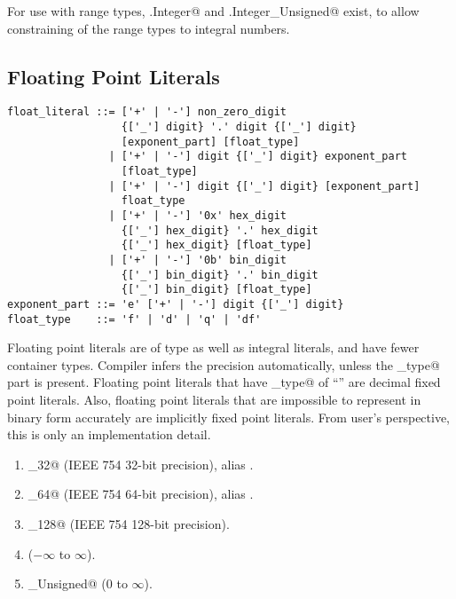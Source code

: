 For use with range types, \lstinline@Number.Integer@ and \lstinline@Number.Integer_Unsigned@ exist, to allow constraining of the range types to integral numbers.

\subsection{Floating Point Literals}\label{sec:floatliterals}

\syntax\begin{lstlisting}
float_literal ::= ['+' | '-'] non_zero_digit 
		          {['_'] digit} '.' digit {['_'] digit}
		          [exponent_part] [float_type]
	            | ['+' | '-'] digit {['_'] digit} exponent_part 
	              [float_type]
	            | ['+' | '-'] digit {['_'] digit} [exponent_part] 
	              float_type
	            | ['+' | '-'] '0x' hex_digit
		          {['_'] hex_digit} '.' hex_digit 
		          {['_'] hex_digit} [float_type]
	            | ['+' | '-'] '0b' bin_digit
		          {['_'] bin_digit} '.' bin_digit 
		          {['_'] bin_digit} [float_type]
exponent_part ::= 'e' ['+' | '-'] digit {['_'] digit}
float_type    ::= 'f' | 'd' | 'q' | 'df'
\end{lstlisting}

Floating point literals are of type \lstinline@Number@ as well as integral literals, and have fewer container types. Compiler infers the precision automatically, unless the \lstinline@float_type@ part is present. Floating point literals that have \lstinline@float_type@ of ``'' are decimal fixed point literals. Also, floating point literals that are impossible to represent in binary form accurately are implicitly fixed point literals. From user's perspective, this is only an implementation detail. 

\begin{enumerate}

\item \lstinline@Float_32@ (IEEE 754 32-bit precision), alias \lstinline@Float@. 

\item \lstinline@Float_64@ (IEEE 754 64-bit precision), alias \lstinline@Double@.

\item \lstinline@Float_128@ (IEEE 754 128-bit precision).

\item \lstinline@Decimal@ ($-\infty$ to $\infty$).

\item \lstinline@Decimal_Unsigned@ ($0$ to $\infty$).

\end{enumerate}


